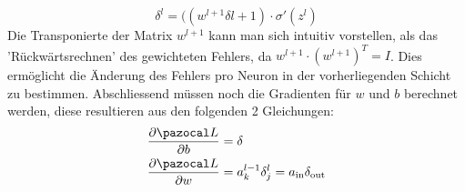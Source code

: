 \begin{equation}
\delta^{l} = ((w^{l+1} \delta{l+1}) \cdot \sigma'(z^l)
\end{equation}
Die Transponierte der Matrix $w^{l+1}$ kann man sich intuitiv vorstellen, als das 'Rückwärtsrechnen' des gewichteten Fehlers, da $w^{l+1} \cdot (w^{l+1})^T = I$. Dies ermöglicht die Änderung des Fehlers pro Neuron in der vorherliegenden Schicht zu bestimmen. Abschliessend müssen noch die Gradienten für $w$ und $b$ berechnet werden, diese resultieren aus den folgenden 2 Gleichungen:
\begin{equation}
\begin{split}
\frac{\partial \Lb}{\partial b} & = \delta \\
\frac{\partial \Lb}{\partial w} & = a^{l-1}_{k} \delta^{l}_j = a_{\text{in}} \delta_{\text{out}}
\end{split}
\end{equation}